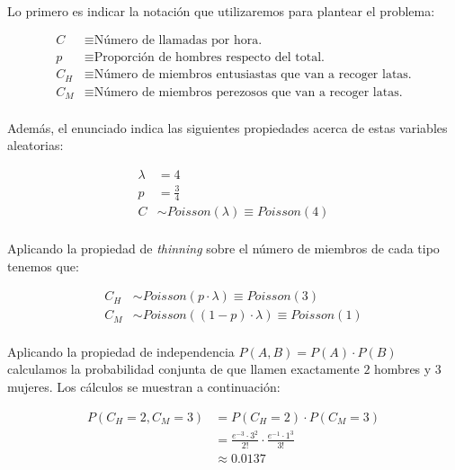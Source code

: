 \documentclass[a4paper, spanish]{article}
\begin{document}
    \paragraph{}
    Lo primero es indicar la notación que utilizaremos para plantear el problema:

    \begin{align*}
      C &\equiv \text{Número de llamadas por hora.} \\
      p &\equiv \text{Proporción de hombres respecto del total.} \\
      C_H &\equiv \text{Número de miembros entusiastas que van a recoger latas.} \\
      C_M &\equiv \text{Número de miembros perezosos que van a recoger latas.}
    \end{align*}

    \paragraph{}
    Además, el enunciado indica las siguientes propiedades acerca de estas variables aleatorias:

    \begin{align*}
      \lambda &= 4 \\
      p &= \frac{3}{4} \\
      C &\sim Poisson(\lambda) \equiv Poisson(4)
    \end{align*}

    \paragraph{}
    Aplicando la propiedad de \emph{thinning} sobre el número de miembros de cada tipo tenemos que:

    \begin{align*}
      C_H &\sim Poisson(p \cdot \lambda) \equiv Poisson(3) \\
      C_M &\sim Poisson((1 - p) \cdot \lambda) \equiv Poisson(1)
    \end{align*}

    \paragraph{}
    Aplicando la propiedad de independencia $P(A, B) = P(A) \cdot P(B)$ calculamos la probabilidad conjunta de que llamen exactamente $2$ hombres y $3$ mujeres. Los cálculos se muestran a continuación:

    \begin{align*}
      P(C_H = 2, C_M = 3)
      &= P(C_H = 2) \cdot P(C_M = 3) \\
      &= \frac{e^{-3} \cdot 3^2}{2!} \cdot \frac{e^{-1} \cdot 1^3}{3!} \\
      &\approx 0.0137
    \end{align*}
\end{document}
